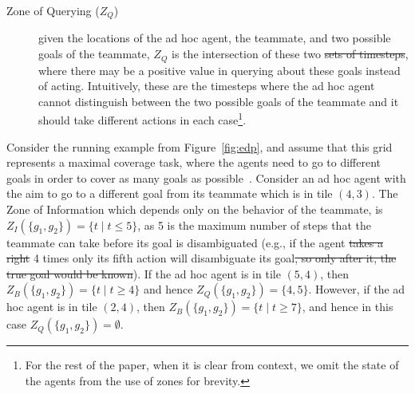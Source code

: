 \documentclass[letterpaper]{article}
\providecommand{\DIFaddtex}[1]{{\protect\color{blue}\uwave{#1}}} %
\providecommand{\DIFdeltex}[1]{{\protect\color{red}\sout{#1}}}                      %
\providecommand{\DIFaddbegin}{} %
\providecommand{\DIFaddend}{} %
\providecommand{\DIFdelbegin}{} %
\providecommand{\DIFdelend}{} %
\providecommand{\DIFadd}[1]{\texorpdfstring{\DIFaddtex{#1}}{#1}} %
\providecommand{\DIFdel}[1]{\texorpdfstring{\DIFdeltex{#1}}{}} %
\newcommand{\DIFscaledelfig}{0.5}
\newlength{\DIFdelgraphicswidth} %
\newlength{\DIFdelgraphicsheight} %
\newcommand{\DIFaddincludegraphics}[2][]{{\color{blue}\fbox{\DIFOincludegraphics[#1]{#2}}}} %
\newcommand{\DIFdelincludegraphics}[2][]{%
\sbox{\DIFdelgraphicsbox}{\DIFOincludegraphics[#1]{#2}}%
\settoboxwidth{\DIFdelgraphicswidth}{\DIFdelgraphicsbox} %
\settoboxtotalheight{\DIFdelgraphicsheight}{\DIFdelgraphicsbox} %
\scalebox{\DIFscaledelfig}{%
\parbox[b]{\DIFdelgraphicswidth}{\usebox{\DIFdelgraphicsbox}\\[-\baselineskip] \rule{\DIFdelgraphicswidth}{0em}}\llap{\resizebox{\DIFdelgraphicswidth}{\DIFdelgraphicsheight}{%
\setlength{\unitlength}{\DIFdelgraphicswidth}%
\begin{picture}(1,1)%
\thicklines\linethickness{2pt} %
{\color[rgb]{1,0,0}\put(0,0){\framebox(1,1){}}}%
{\color[rgb]{1,0,0}\put(0,0){\line( 1,1){1}}}%
{\color[rgb]{1,0,0}\put(0,1){\line(1,-1){1}}}%
\end{picture}%
}\hspace*{3pt}}} %
} %
\DeclareRobustCommand{\DIFaddbegin}{\DIFOaddbegin \let\includegraphics\DIFaddincludegraphics} %
\DeclareRobustCommand{\DIFaddend}{\DIFOaddend \let\includegraphics\DIFOincludegraphics} %
\DeclareRobustCommand{\DIFdelbegin}{\DIFOdelbegin \let\includegraphics\DIFdelincludegraphics} %
\DeclareRobustCommand{\DIFdelend}{\DIFOaddend \let\includegraphics\DIFOincludegraphics} %
\begin{document}
\begin{description}

\DIFaddend \item [Zone of Querying ($Z_Q$)] given the locations of the ad hoc agent, the teammate, and two possible goals of the teammate, $Z_Q$ is the intersection of these two \DIFdelbegin \DIFdel{sets of timesteps}\DIFdelend \DIFaddbegin \DIFadd{intervals}\DIFaddend , where there may be a positive value in querying about these goals instead of acting. Intuitively, these are the timesteps where the ad hoc agent cannot distinguish between the two possible goals of the teammate and it should take different actions in each case\footnote{For the rest of the paper, when it is clear from context, we omit the state of the agents from the use of zones for brevity.}.
\end{description}

\noindent  Consider the running example from Figure~\ref{fig:edp}, and assume that this grid represents a maximal coverage task, where the agents need to go to different goals in order to cover as many goals as possible~\cite{pita2008deployed}. Consider an ad hoc agent with the aim to go to a different goal from its teammate which is in tile $(4,3)$. The Zone of Information which depends only on the behavior of the teammate, is $Z_I(\{g_1,g_2\})=\{t \mid t \leq 5\}$, as 5 is the maximum number of steps that the teammate can take before its goal is disambiguated (e.g., if the agent \DIFdelbegin \DIFdel{takes a right }\DIFdelend \DIFaddbegin \DIFadd{moves east }\DIFaddend 4 times only its fifth action will disambiguate its goal\DIFdelbegin \DIFdel{, so only after it, the true goal would be known}\DIFdelend ). If the ad hoc agent is in tile $(5,4)$, then $Z_B(\{g_1,g_2\})=\{t \mid t \geq 4\}$ and hence $Z_Q(\{g_1,g_2\})=\{4,5\}$. However, if the ad hoc agent is in tile $(2,4)$, then $Z_B(\{g_1,g_2\})=\{t \mid t \geq 7\}$, and hence in this case $Z_Q(\{g_1,g_2\})=\emptyset$.
\DIFdelbegin %

\DIFdelend %
\DIFdelbegin %
\end{document}
